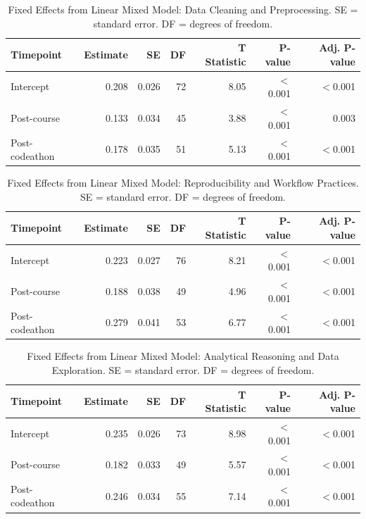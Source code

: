 \documentclass[11pt, oneside]{article}   	%
\begin{document}
\begin{longtable}[]{@{}lrrrrrr@{}}
\caption{Fixed Effects from Linear Mixed Model: Data Cleaning and Preprocessing. SE = standard error. DF = degrees of freedom.}\label{tbl-six}\tabularnewline
\toprule\noalign{}
Timepoint & Estimate & SE & DF & T Statistic & P-value & Adj. P-value \\
\midrule\noalign{}
\endhead
\bottomrule\noalign{}
\endlastfoot
Intercept &	    0.208 &	0.026 &	72 & 8.05 & $<$0.001 & $<$0.001 \\
Post-course &	    0.133 &	0.034 &	45 & 3.88 &	$<$0.001 & 0.003 \\
Post-codeathon &	0.178 &	0.035 &	51 & 5.13 & $<$0.001 & $<$0.001 \\
\end{longtable}

\begin{longtable}[]{@{}lrrrrrr@{}}
\caption{Fixed Effects from Linear Mixed Model: Reproducibility and Workflow Practices. SE = standard error. DF = degrees of freedom.}\label{tbl-seven}\tabularnewline
\toprule\noalign{}
Timepoint & Estimate & SE & DF & T Statistic & P-value & Adj. P-value \\
\midrule\noalign{}
\endhead
\bottomrule\noalign{}
\endlastfoot
Intercept  & 0.223  & 0.027  & 76  & 8.21  & $<$0.001  & $<$0.001 \\
Post-course  & 0.188  & 0.038  & 49  & 4.96  & $<$0.001  & $<$0.001 \\
Post-codeathon  & 0.279  & 0.041  & 53  & 6.77  & $<$0.001  & $<$0.001 \\
\end{longtable}

\begin{longtable}[]{@{}lrrrrrr@{}}
\caption{Fixed Effects from Linear Mixed Model: Analytical Reasoning and Data Exploration. SE = standard error. DF = degrees of freedom.}\label{tbl-eight}\tabularnewline
\toprule\noalign{}
Timepoint & Estimate & SE & DF & T Statistic & P-value & Adj. P-value \\
\midrule\noalign{}
\endhead
\bottomrule\noalign{}
\endlastfoot
Intercept	& 0.235	& 0.026	& 73	& 8.98	& $<$0.001	& $<$0.001 \\
Post-course	& 0.182	& 0.033	& 49	& 5.57	& $<$0.001	& $<$0.001 \\
Post-codeathon	& 0.246	& 0.034	& 55	& 7.14	& $<$0.001	& $<$0.001 \\
\end{longtable}

\vspace{1cm}
\end{document}
